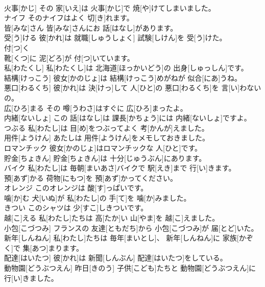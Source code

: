 \documentclass[8pt]{extreport}
\begin{document}
\begin{CJK}{UTF8}{min}
\\	火事[かじ]	その 家[いえ]は 火事[かじ]で 焼[や]けてしまいました。		
\\	ナイフ	そのナイフはよく 切[き]れます。		
\\	皆[みな]さん	皆[みな]さんにお 話[はなし]があります。		
\\	受[う]ける	彼[かれ]は 就職[しゅうしょく] 試験[しけん]を 受[う]けた。		
\\	付[つ]く
\\	靴[くつ]に 泥[どろ]が 付[つ]いています。		
\\	私[わたくし]	私[わたくし]は 北海道[ほっかいどう]の 出身[しゅっしん]です。		
\\	結構[けっこう]	彼女[かのじょ]は 結構[けっこう]めがねが 似合[にあ]うね。		
\\	悪口[わるくち]	彼[かれ]は 決[けっ]して 人[ひと]の 悪口[わるくち]を 言[い]わないの。		
\\	広[ひろ]まる	その 噂[うわさ]はすぐに 広[ひろ]まったよ。		
\\	内緒[ないしょ]	この 話[はなし]は 課長[かちょう]には 内緒[ないしょ]ですよ。		
\\	つぶる	私[わたし]は 目[め]をつぶってよく 考[かんが]えました。		
\\	用件[ようけん]	あたしは 用件[ようけん]をメモしておきました。		
\\	ロマンチック	彼女[かのじょ]はロマンチックな 人[ひと]です。		
\\	貯金[ちょきん]	貯金[ちょきん]は 十分[じゅうぶん]にあります。		
\\	バイク	私[わたし]は 毎朝[まいあさ]バイクで 駅[えき]まで 行[い]きます。		
\\	預[あず]かる	荷物[にもつ]を 預[あず]かってください。		
\\	オレンジ	このオレンジは 酸[す]っぱいです。		
\\	噛[か]む	犬[いぬ]が 私[わたし]の 手[て]を 噛[か]みました。		
\\	きつい	このシャツは 少[すこ]しきついです。		
\\	越[こ]える	私[わたし]たちは 高[たか]い 山[やま]を 越[こ]えました。		
\\	小包[こづつみ]	フランスの 友達[ともだち]から 小包[こづつみ]が 届[とど]いた。		
\\	新年[しんねん]	私[わたし]たちは 毎年[まいとし]、 新年[しんねん]に 家族[かぞく]で 集[あつ]まります。		
\\	配達[はいたつ]	彼[かれ]は 新聞[しんぶん] 配達[はいたつ]をしている。		
\\	動物園[どうぶつえん]	昨日[きのう] 子供[こども]たちと 動物園[どうぶつえん]に 行[い]きました。		

\end{CJK}
\end{document}
